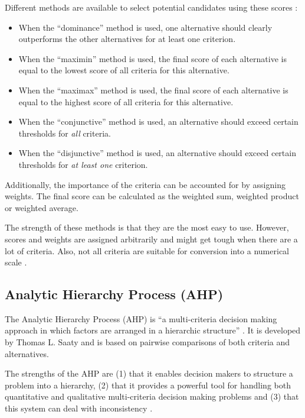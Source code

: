 Different methods are available to select potential candidates using these scores \cite{Kahraman:2008}:

\begin{itemize}
    \item When the ``dominance'' method is used, one alternative should clearly outperforms the other alternatives for at least one criterion. 
    \item When the ``maximin'' method is used, the final score of each alternative is equal to the lowest score of all criteria for this alternative.
    \item When the ``maximax'' method is used, the final score of each alternative is equal to the highest score of all criteria for this alternative.
    \item When the ``conjunctive'' method is used, an alternative should exceed certain thresholds for \emph{all} criteria.
    \item When the ``disjunctive'' method is used, an alternative should exceed certain thresholds for \emph{at least one} criterion. 
\end{itemize}

Additionally, the importance of the criteria can be accounted for by assigning weights. The final score can be calculated as the weighted sum, weighted product or weighted average.

The strength of these methods is that they are the most easy to use. However,  scores and weights are assigned arbitrarily and might get tough when there are a lot of criteria. Also, not all criteria are suitable for conversion into a numerical scale \cite{Jadhav:2009}.

\subsection{Analytic Hierarchy Process (AHP)}
\label{sec:ahp}

The Analytic Hierarchy Process (AHP) is ``a multi-criteria decision making approach in which factors are arranged in a hierarchic structure'' \cite{Saaty:1990}. It is developed by Thomas L. Saaty and is based on pairwise comparisons of both criteria and alternatives. 

The strengths of the AHP are (1) that it enables decision makers to structure a problem into a hierarchy, (2) that it provides a powerful tool for handling both quantitative and qualitative multi-criteria decision making problems and (3) that this system can deal with inconsistency \cite{Jadhav:2009}. 

